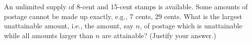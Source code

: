 An unlimited supply of 8-cent and 15-cent stamps is available. Some amounts of postage cannot be made up exactly, e.g., 7 cents, 29 cents. What is the largest unattainable amount, i.e., the amount, say $n$,  of postage which is unattainable while all amounts larger than $n$ are attainable? (Justify your answer.)